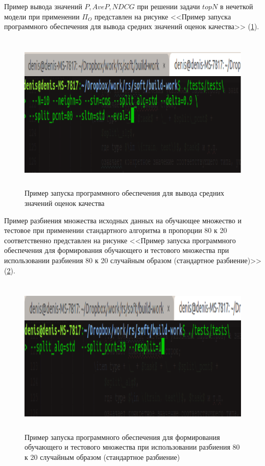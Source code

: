 Пример вывода значений $P, AveP, NDCG$ при решении задачи $topN$ в нечеткой
модели при применении $\Pi_O$ представлен на рисунке <<Пример запуска программного обеспечения для вывода средних значений оценок
качества>> (\ref{pic:eval}).
\begin{figure}[H]
	\caption{Пример запуска программного обеспечения для вывода средних значений оценок
качества}
\label{pic:eval}
	\begin{center}
  \includegraphics[width=7in,height=3in]{pics/examples/eval.png}
\end{center}
\end{figure}

Пример разбиения множества исходных данных на обучающее множество и тестовое
при применении стандартного алгоритма в пропорции 80 к 20 соответственно
представлен на рисунке <<Пример запуска программного обеспечения для формирования обучающего и тестового
множества при использовании разбиения 80 к 20 случайным образом (стандартное
разбиение)>> (\ref{pic:resplit}).
\begin{figure}[H]
	\caption{Пример запуска программного обеспечения для формирования обучающего и тестового
множества при использовании разбиения 80 к 20 случайным образом (стандартное
разбиение)}
\label{pic:resplit}
	\begin{center}
  \includegraphics[width=7in,height=3in]{pics/examples/resplit.png}
\end{center}
\end{figure}
